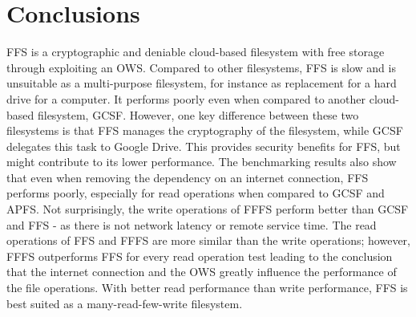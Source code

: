 
\section{Conclusions}
\label{sec:conclusions}
  


\gls{FFS} is a cryptographic and deniable \mbox{cloud-based} filesystem with free storage through exploiting an \gls{OWS}. Compared to other filesystems, \gls{FFS} is slow and is unsuitable as a \mbox{multi-purpose} filesystem, for instance as replacement for a hard drive for a computer. It performs poorly even when compared to another \mbox{cloud-based} filesystem, \gls{GCSF}. However, one key difference between these two filesystems is that \gls{FFS} manages the cryptography of the filesystem, while \gls{GCSF} delegates this task to Google Drive. This provides security benefits for \gls{FFS}, but might contribute to its lower performance. The benchmarking results also show that even when removing the dependency on an internet connection, \gls{FFS} performs poorly, especially for read operations when compared to \gls{GCSF} and \gls{APFS}. Not surprisingly, the write operations of \gls{FFFS} perform better than \gls{GCSF} and \gls{FFS} - as there is not network latency or remote service time. The read operations of \gls{FFS} and \gls{FFFS} are more similar than the write operations; however, \gls{FFFS} outperforms \gls{FFS} for every read operation test leading to the conclusion that the internet connection and the \gls{OWS} greatly influence the performance of the file operations. With better read performance than write performance, \gls{FFS} is best suited as a \mbox{many-read-few-write} filesystem.

